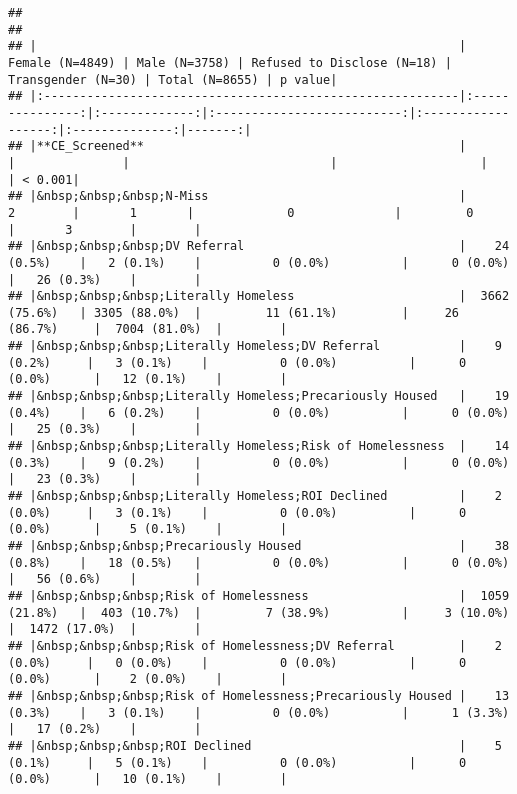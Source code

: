 \documentclass[
]{article}
\begin{document}
\begin{verbatim}
## 
## 
## |                                                           | Female (N=4849) | Male (N=3758) | Refused to Disclose (N=18) | Transgender (N=30) | Total (N=8655) | p value|
## |:----------------------------------------------------------|:---------------:|:-------------:|:--------------------------:|:------------------:|:--------------:|-------:|
## |**CE_Screened**                                            |                 |               |                            |                    |                | < 0.001|
## |&nbsp;&nbsp;&nbsp;N-Miss                                   |        2        |       1       |             0              |         0          |       3        |        |
## |&nbsp;&nbsp;&nbsp;DV Referral                              |    24 (0.5%)    |   2 (0.1%)    |          0 (0.0%)          |      0 (0.0%)      |   26 (0.3%)    |        |
## |&nbsp;&nbsp;&nbsp;Literally Homeless                       |  3662 (75.6%)   | 3305 (88.0%)  |         11 (61.1%)         |     26 (86.7%)     |  7004 (81.0%)  |        |
## |&nbsp;&nbsp;&nbsp;Literally Homeless;DV Referral           |    9 (0.2%)     |   3 (0.1%)    |          0 (0.0%)          |      0 (0.0%)      |   12 (0.1%)    |        |
## |&nbsp;&nbsp;&nbsp;Literally Homeless;Precariously Housed   |    19 (0.4%)    |   6 (0.2%)    |          0 (0.0%)          |      0 (0.0%)      |   25 (0.3%)    |        |
## |&nbsp;&nbsp;&nbsp;Literally Homeless;Risk of Homelessness  |    14 (0.3%)    |   9 (0.2%)    |          0 (0.0%)          |      0 (0.0%)      |   23 (0.3%)    |        |
## |&nbsp;&nbsp;&nbsp;Literally Homeless;ROI Declined          |    2 (0.0%)     |   3 (0.1%)    |          0 (0.0%)          |      0 (0.0%)      |    5 (0.1%)    |        |
## |&nbsp;&nbsp;&nbsp;Precariously Housed                      |    38 (0.8%)    |   18 (0.5%)   |          0 (0.0%)          |      0 (0.0%)      |   56 (0.6%)    |        |
## |&nbsp;&nbsp;&nbsp;Risk of Homelessness                     |  1059 (21.8%)   |  403 (10.7%)  |         7 (38.9%)          |     3 (10.0%)      |  1472 (17.0%)  |        |
## |&nbsp;&nbsp;&nbsp;Risk of Homelessness;DV Referral         |    2 (0.0%)     |   0 (0.0%)    |          0 (0.0%)          |      0 (0.0%)      |    2 (0.0%)    |        |
## |&nbsp;&nbsp;&nbsp;Risk of Homelessness;Precariously Housed |    13 (0.3%)    |   3 (0.1%)    |          0 (0.0%)          |      1 (3.3%)      |   17 (0.2%)    |        |
## |&nbsp;&nbsp;&nbsp;ROI Declined                             |    5 (0.1%)     |   5 (0.1%)    |          0 (0.0%)          |      0 (0.0%)      |   10 (0.1%)    |        |
\end{verbatim}
\end{document}
